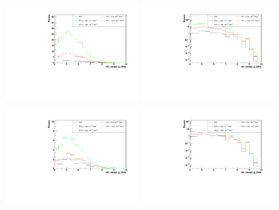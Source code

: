 \begin{figure}[h]
  \begin{center}
	\includegraphics[width=0.45\textwidth]{Plots/aQGC_kinematics/vbf_maxpt_jj_Deta_FT1.pdf}%
	\includegraphics[width=0.45\textwidth]{Plots/aQGC_kinematics/vbf_maxpt_jj_Deta_FT1_log.pdf}\\
    \caption{}
  \end{center}
\end{figure}
\begin{figure}[h]
  \begin{center}
	\includegraphics[width=0.45\textwidth]{Plots/aQGC_kinematics/vbf_maxpt_jj_Deta_FT2.pdf}%
	\includegraphics[width=0.45\textwidth]{Plots/aQGC_kinematics/vbf_maxpt_jj_Deta_FT2_log.pdf}\\
    \caption{}
  \end{center}
\end{figure}

